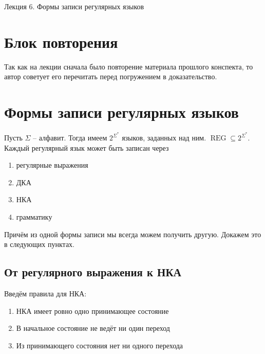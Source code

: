 \documentclass[11pt]{article}
\DeclareMathOperator{\REG}{REG}
\begin{document}
\begin{titlepage}
    \centering
    \vspace*{\fill}  %

    {\Huge Лекция 6. Формы записи регулярных языков
    \par}

    \vspace*{\fill}  %
\end{titlepage}

\setcounter{page}{1}

\section{Блок повторения}

Так как на лекции сначала было повторение материала прошлого конспекта, 
то автор советует его перечитать перед погружением в доказательство.

\section{Формы записи регулярных языков}

\begin{theorem}
    Пусть $\Sigma$ -- алфавит. Тогда имеем $2^{\Sigma^{\ast}}$ языков, 
    заданных над ним. $\REG \subseteq 2^{\Sigma^{\ast}}$. Каждый 
    регулярный язык может быть записан через
    \begin{enumerate}
        \item регулярные выражения
        \item ДКА
        \item НКА
        \item грамматику
    \end{enumerate}
    Причём из одной формы записи мы всегда можем получить другую. 
    Докажем это в следующих пунктах.
\end{theorem}

\subsection{От регулярного выражения к НКА}

Введём правила для НКА:
\begin{enumerate}
    \item НКА имеет ровно одно принимающее состояние
    \item В начальное состояние не ведёт ни один переход
    \item Из принимающего состояния нет ни одного перехода
\end{enumerate}
\end{document}
